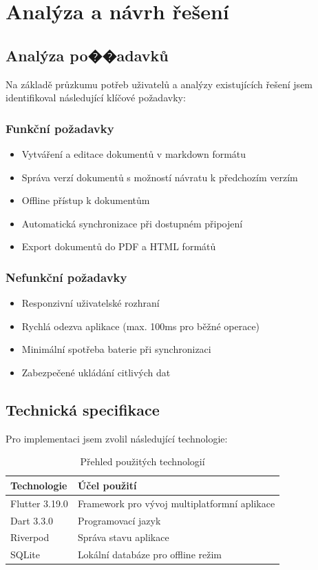 \documentclass[12pt, a4paper,
twoside,        %
openright
]{report}
\begin{document}
\chapter{Analýza a návrh řešení}
\label{chap:analyza}

\section{Analýza po��adavků}
Na základě průzkumu potřeb uživatelů a analýzy existujících řešení jsem identifikoval následující klíčové požadavky:

\subsection{Funkční požadavky}
\begin{itemize}
    \item Vytváření a editace dokumentů v markdown formátu
    \item Správa verzí dokumentů s možností návratu k předchozím verzím
    \item Offline přístup k dokumentům
    \item Automatická synchronizace při dostupném připojení
    \item Export dokumentů do PDF a HTML formátů
\end{itemize}

\subsection{Nefunkční požadavky}
\begin{itemize}
    \item Responzivní uživatelské rozhraní
    \item Rychlá odezva aplikace (max. 100ms pro běžné operace)
    \item Minimální spotřeba baterie při synchronizaci
    \item Zabezpečené ukládání citlivých dat
\end{itemize}

\section{Technická specifikace}
Pro implementaci jsem zvolil následující technologie:

\begin{table}[h]
\caption{Přehled použitých technologií}
\label{tab:technologie}
\begin{tabular}{ll}
\toprule
\textbf{Technologie} & \textbf{Účel použití} \\
\midrule
Flutter 3.19.0 & Framework pro vývoj multiplatformní aplikace \\
Dart 3.3.0 & Programovací jazyk \\
Riverpod & Správa stavu aplikace \\
SQLite & Lokální databáze pro offline režim \\
\bottomrule
\end{tabular}
\end{table}
\end{document}
